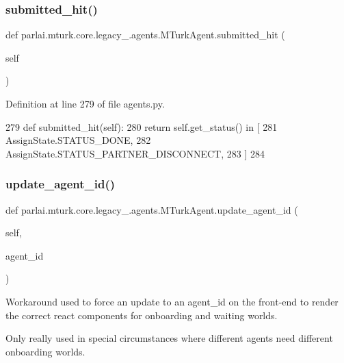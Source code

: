 \subsubsection{\texorpdfstring{submitted\+\_\+hit()}{submitted\_hit()}}
{\footnotesize\ttfamily def parlai.\+mturk.\+core.\+legacy\+\_.\+agents.\+M\+Turk\+Agent.\+submitted\+\_\+hit (\begin{DoxyParamCaption}\item[{}]{self }\end{DoxyParamCaption})}



Definition at line 279 of file agents.\+py.


\begin{DoxyCode}
279     \textcolor{keyword}{def }submitted\_hit(self):
280         \textcolor{keywordflow}{return} self.get\_status() \textcolor{keywordflow}{in} [
281             AssignState.STATUS\_DONE,
282             AssignState.STATUS\_PARTNER\_DISCONNECT,
283         ]
284 
\end{DoxyCode}
\mbox{\label{classparlai_1_1mturk_1_1core_1_1legacy__2018_1_1agents_1_1MTurkAgent_a72ce27a25ace6cceda8d01bf6bf9f294}} 
\subsubsection{\texorpdfstring{update\+\_\+agent\+\_\+id()}{update\_agent\_id()}}
{\footnotesize\ttfamily def parlai.\+mturk.\+core.\+legacy\+\_.\+agents.\+M\+Turk\+Agent.\+update\+\_\+agent\+\_\+id (\begin{DoxyParamCaption}\item[{}]{self,  }\item[{}]{agent\+\_\+id }\end{DoxyParamCaption})}

\begin{DoxyVerb}Workaround used to force an update to an agent_id on the front-end to render the
correct react components for onboarding and waiting worlds.

Only really used in special circumstances where different agents need different
onboarding worlds.
\end{DoxyVerb}
 

